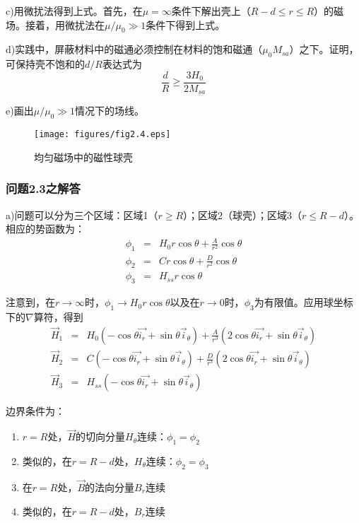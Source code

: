 c)用微扰法得到上式。首先，在$\mu=\infty$条件下解出壳上（$R-d\le r\le R$）的磁场。接着，用微扰法在$\mu/\mu_0 \gg 1$条件下得到上式。

d)实践中，屏蔽材料中的磁通必须控制在材料的饱和磁通（$\mu_0 M_{sa}$）之下。证明，可保持壳不饱和的$d/R$表达式为
\begin{equation}
\frac{d}{R} \ge \frac{3H_0}{2M_{sa}}
\end{equation}

e)画出$\mu/\mu_0 \gg 1$情况下的场线。

\begin{figure}
  \centering
 \texttt{[image: figures/fig2.4.eps]}
  \caption{均匀磁场中的磁性球壳}
\end{figure}

\subsubsection*{问题2.3之解答}
a)问题可以分为三个区域：区域1（$r\ge R$）；区域2（球壳）；区域3（$r\le R-d$）。相应的势函数为：
\begin{eqnarray*}
  \phi_1 &=& H_0 r\cos\theta+\frac{A}{r^2}\cos\theta \\
  \phi_2 &=& C r \cos\theta+\frac{D}{r^2}\cos\theta \\
  \phi_3 &=& H_{ss} r\cos\theta
\end{eqnarray*}

注意到，在$r\rightarrow \infty$时，$\phi_1 \rightarrow H_0 r\cos\theta$以及在$r\rightarrow 0$时，$\phi_3$为有限值。应用球坐标下的$\nabla$算符，得到
\begin{eqnarray*}
  \vec{H}_1 &=& H_0 (-\cos\theta\vec{i_r}+\sin\theta\vec{i}_\theta)+\frac{A}{r^3} (2\cos\theta\vec{i_r}+\sin\theta\vec{i}_\theta)\\
  \vec{H}_2 &=& C(-\cos\theta\vec{i_r}+\sin\theta\vec{i}_\theta)+\frac{D}{r^3} (2\cos\theta\vec{i_r}+\sin\theta\vec{i}_\theta)\\
   \vec{H}_3 &=& H_{ss}  (-\cos\theta\vec{i_r}+\sin\theta\vec{i}_\theta)
\end{eqnarray*}

边界条件为：
\begin{enumerate}
  \item $r=R$处，$\vec{H}$的切向分量$H_\theta$连续：$\phi_1=\phi_2   $
  \item 类似的，在$r=R-d$处，$H_\theta$连续：$\phi_2=\phi_3  $
  \item 在$r=R$处，$\vec{B}$的法向分量$B_r$连续
  \item 类似的，在$r=R-d$处，$B_r$连续
\end{enumerate}

